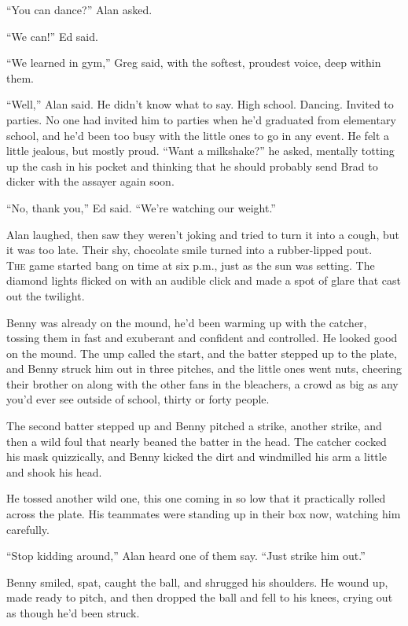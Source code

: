 \documentclass{article}
\begin{document}
``You can dance?'' Alan asked.

``We can!'' Ed said.

``We learned in gym,'' Greg said, with the softest, proudest voice,
deep within them.

``Well,'' Alan said.  He didn't know what to say.  High school. 
Dancing.  Invited to parties.  No one had invited him to parties when
he'd graduated from elementary school, and he'd been too busy with the
little ones to go in any event.  He felt a little jealous, but mostly
proud.  ``Want a milkshake?'' he asked, mentally totting up the cash
in his pocket and thinking that he should probably send Brad to dicker
with the assayer again soon.

``No, thank you,'' Ed said.  ``We're watching our weight.''

Alan laughed, then saw they weren't joking and tried to turn it into a
cough, but it was too late.  Their shy, chocolate smile turned into a
rubber-lipped pout.
\\
\lettrine[lines=3, lhang=.5, nindent=0pt, findent=2pt]{T}{he} game started bang on time at six p.m., just as the sun was
setting.  The diamond lights flicked on with an audible click and made
a spot of glare that cast out the twilight.

Benny was already on the mound, he'd been warming up with the catcher,
tossing them in fast and exuberant and confident and controlled.  He
looked good on the mound.  The ump called the start, and the batter
stepped up to the plate, and Benny struck him out in three pitches,
and the little ones went nuts, cheering their brother on along with
the other fans in the bleachers, a crowd as big as any you'd ever see
outside of school, thirty or forty people.

The second batter stepped up and Benny pitched a strike, another
strike, and then a wild foul that nearly beaned the batter in the
head.  The catcher cocked his mask quizzically, and Benny kicked the
dirt and windmilled his arm a little and shook his head.

He tossed another wild one, this one coming in so low that it
practically rolled across the plate.  His teammates were standing up
in their box now, watching him carefully.

``Stop kidding around,'' Alan heard one of them say.  ``Just strike
him out.''

Benny smiled, spat, caught the ball, and shrugged his shoulders.  He
wound up, made ready to pitch, and then dropped the ball and fell to
his knees, crying out as though he'd been struck.
\end{document}

